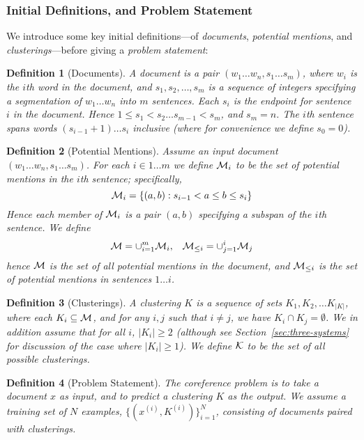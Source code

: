 \documentclass[11pt,a4paper]{article}
\newtheorem{definition}{Definition}
\begin{document}
\subsubsection{Initial Definitions, and Problem Statement}

We introduce some key initial definitions---of {\em documents}, {\em potential mentions}, and {\em clusterings}---before giving a {\em problem statement}:

\begin{definition}[Documents]
A document is a pair $(w_1 \ldots w_n, s_1 \ldots s_m)$, where $w_i$ is the $i$th word in the document, and $s_1, s_2, \ldots, s_m$ is a sequence of integers specifying a segmentation of $w_1 \ldots w_n$ into $m$ sentences. Each $s_i$ is the endpoint for sentence $i$ in the document. Hence $1 \leq s_1 < s_2 \ldots s_{m-1} < s_m$, and $s_m = n$. The $i$th sentence spans words $(s_{i-1}+1) \ldots s_i$ inclusive (where for convenience we define $s_0 = 0$).
\end{definition}

\begin{definition}[Potential Mentions]
Assume an input document $(w_1 \ldots w_n, s_1 \ldots s_m)$.
For each $i \in 1 \ldots m$ we define ${\cal M}_i$ to be the set of {\em potential mentions} in the $i$th sentence; specifically,
\[
{\cal M}_i = \{ (a, b): s_{i-1} < a \leq b \leq s_i \}
\]
Hence each member of ${\cal M}_i$ is a pair $(a, b)$ specifying a subspan of the $i$th sentence. We define
\[
{\cal M} = \cup_{i=1}^m {\cal M}_i,
\;\;\;
{\cal M}_{\leq i} = \cup_{j=1}^i {\cal M}_j
\]
hence ${\cal M}$ is the set of all potential mentions in the document, and ${\cal M}_{\leq i}$ is the set of potential mentions in sentences $1 \ldots i$.
\end{definition}

\begin{definition}[Clusterings]
A clustering $K$ is a sequence of sets $K_1, K_2, \ldots K_{|K|}$, where each $K_i \subseteq {\cal M}$, and for any $i, j$ such that $i \neq j$, we have $K_i \cap K_j = \emptyset$. We in addition assume that for all $i$, $|K_i| \geq 2$ (although see Section~\ref{sec:three-systems} for discussion of the case where $|K_i| \geq 1$). We define ${\cal K}$ to be the set of all possible clusterings. 
\end{definition}

\begin{definition}[Problem Statement] 
The coreference problem is to take a document $x$ as input, and to predict a clustering $K$ as the output. We assume a training set of $N$ examples, $\{(x^{(i)}, K^{(i)})\}_{i=1}^N$, consisting of documents paired with clusterings.
\end{definition}
\end{document}
